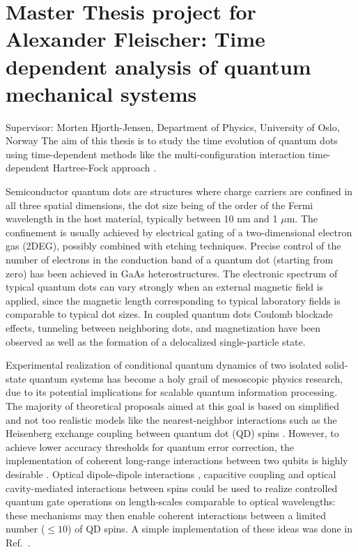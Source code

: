 \newcommand{\OP}[1]{{\bf\widehat{#1}}}

\newcommand{\be}{\begin{equation}}

\newcommand{\ee}{\end{equation}}



\pagestyle{plain}

\section*{Master Thesis project for Alexander Fleischer: Time dependent analysis of quantum mechanical systems}
Supervisor: Morten Hjorth-Jensen, Department of Physics, University of Oslo, Norway\newline\newline
The aim of this thesis is to study the time evolution  of quantum dots using
time-dependent methods like the multi-configuration interaction time-dependent Hartree-Fock approach \cite{Skattum2013}. 

Semiconductor quantum dots are structures where
charge carriers are confined in all three spatial dimensions, 
the dot size being of the order of the Fermi wavelength 
in the host material, typically between  10 nm and  1 $\mu$m.
The confinement is usually achieved by electrical gating of a 
two-dimensional electron gas (2DEG), 
possibly combined with etching techniques. Precise control of the
number of electrons in the conduction band of a quantum dot 
(starting from zero) has been achieved in GaAs heterostructures. 
The electronic spectrum of typical quantum dots
can vary strongly when an external magnetic field is applied, 
since the magnetic length corresponding to typical 
laboratory fields  is comparable to typical dot sizes.
In coupled quantum dots Coulomb blockade effects, 
tunneling between neighboring dots, and magnetization 
have been observed as well as the formation of a
delocalized single-particle state. 


 Experimental realization of conditional
quantum dynamics of two isolated solid-state quantum systems has
become a holy grail of mesoscopic physics research, due to its
potential implications for scalable quantum information
processing.  The majority of theoretical proposals aimed at this
goal is based on simplified and not too realistic models like the nearest-neighbor interactions such as the
Heisenberg exchange coupling between quantum dot (QD) spins
\cite{Loss1999}. However, to achieve lower accuracy thresholds
for quantum error correction, the
implementation of coherent long-range interactions between two
qubits is highly desirable \cite{Imamoglu99}. 
Optical dipole-dipole interactions \cite{Calarco2003},
capacitive coupling \cite{Taylor2005}
and optical cavity-mediated interactions \cite{Imamoglu99} 
between spins could be used to realize
controlled quantum gate operations on length-scales comparable to
optical wavelengths: these mechanisms may then enable coherent
interactions between a limited number ($\le 10$) of QD spins. A simple implementation of these ideas was done in Ref.~\cite{Burkard2006}.

